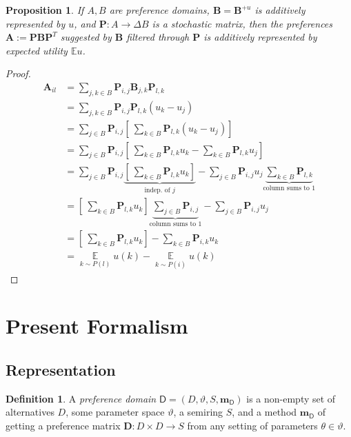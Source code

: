 \documentclass{article}
\theoremstyle{plain}
\newtheorem{prop}[theorem]{Proposition}
\theoremstyle{definition}
\newtheorem{defn}{Definition}[section]
\theoremstyle{remark}
\newcommand\mat[1]{\mathbf #1}
\newcommand\m[1]{\mathbf m_{\mathsf #1}}
\begin{document}
	\begin{prop}
		If $A, B$ are preference domains, $\mat B = \mat B^{+u}$ is additively represented by $u$, and $\mat P : A \to \Delta B$ is a stochastic matrix, then the preferences $\mat A := \mat P \mat B \mat P^T$ suggested by $\mat B$ filtered through $\mat P$ is additively represented by expected utility $\mathbb E u$.
	\end{prop}
	\begin{proof}
		\begin{align*}
			\mat A_{il} &= \sum_{j,k \in B} \mat P_{i,j} \mat B_{j,k} \mat P_{l,k} \\
				&= \sum_{j,k \in B} \mat P_{i,j}  \mat P_{l,k} (u_k - u_j) \\
				&= \sum_{j \in B} \mat P_{i,j} \left[ ~\sum_{k \in B} \mat P_{l,k} (u_k - u_j)\right]\\
				&= \sum_{j \in B} \mat P_{i,j} \left[ ~\sum_{k \in B} \mat P_{l,k} u_k - \sum_{k \in B} \mat P_{l,k} u_j \right] \\
				&= \sum_{j \in B} \mat P_{i,j} \underbrace{\left[ ~\sum_{k \in B} \mat P_{l,k} u_k  \right]}_{\text{indep. of $j$}} -  \sum_{j \in B} \mat P_{i,j} u_j \underbrace{\sum_{k \in B} \mat P_{l,k}}_{\text{column sums to 1}} \\
				&= \left[ ~\sum_{k \in B} \mat P_{l,k} u_k  \right] \underbrace{\sum_{j \in B} \mat P_{i,j}}_{\text{column sums to 1}} -  \sum_{j \in B} \mat P_{i,j} u_j \\
				&= \left[ ~\sum_{k \in B} \mat P_{l,k} u_k  \right]  -  \sum_{k \in B} \mat P_{i,k} u_k \\
				&= \mathop{\mathbb E}\limits_{k \sim P(l)} u(k) - \mathop{\mathbb E}\limits_{k \sim P(i)} u(k)
		\end{align*}
	\end{proof}

	\section{Present Formalism}
	\subsection{Representation}
	\begin{defn}
		A \emph{preference domain} $\mathsf D = (D, \vartheta, S, \m D)$ is a non-empty set of alternatives $D$, some parameter space $\vartheta$, a semiring $S$, and a method $\m D$ of getting a preference matrix $\mat D: D \times D \to S$ from any setting of parameters $\theta \in \vartheta$.
	\end{defn}
\end{document}
